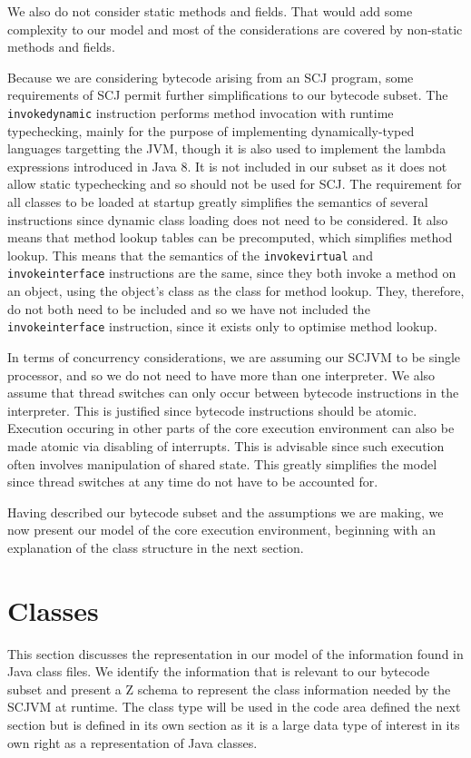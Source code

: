 \documentclass[a4paper,10pt]{report}
\begin{document}
We also do not consider static methods and fields.
That would add some complexity to our model and most of the
considerations are covered by non-static methods and fields.

Because we are considering bytecode arising from an SCJ program, some
requirements of SCJ permit further simplifications to our bytecode
subset.
The \texttt{invokedynamic} instruction performs method invocation with
runtime typechecking, mainly for the purpose of implementing
dynamically-typed languages targetting the JVM, though it is also used
to implement the lambda expressions introduced in Java 8.
It is not included in our subset as it does not allow static
typechecking and so should not be used for SCJ.
The requirement for all classes to be loaded at startup greatly
simplifies the semantics of several instructions since dynamic class
loading does not need to be considered.
It also means that method lookup tables can be precomputed, which
simplifies method lookup.
This means that the semantics of the \texttt{invokevirtual} and
\texttt{invokeinterface} instructions are the same, since they both
invoke a method on an object, using the object's class as the class
for method lookup.
They, therefore, do not both need to be included and so we have not
included the \texttt{invokeinterface} instruction, since it exists
only to optimise method lookup.

In terms of concurrency considerations, we are assuming our SCJVM to
be single processor, and so we do not need to have more than one
interpreter.
We also assume that thread switches can only occur between bytecode
instructions in the interpreter.
This is justified since bytecode instructions should be atomic.
Execution occuring in other parts of the core execution environment
can also be made atomic via disabling of interrupts.
This is advisable since such execution often involves manipulation of
shared state.
This greatly simplifies the model since thread switches at any time do
not have to be accounted for.

Having described our bytecode subset and the assumptions we are
making, we now present our model of the core execution environment,
beginning with an explanation of the class structure in the next
section.

\section{Classes}
\label{cee-classes-section}

This section discusses the representation in our model of the
information found in Java class files.
We identify the information that is relevant to our bytecode subset
and present a Z schema to represent the class information needed by
the SCJVM at runtime.
The class type will be used in the code area defined the next section
but is defined in its own section as it is a large data type of
interest in its own right as a representation of Java classes.
\end{document}
